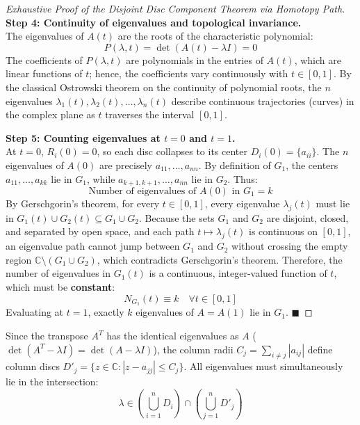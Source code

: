 \begin{proof}[Exhaustive Proof of the Disjoint Disc Component Theorem via Homotopy Path]
\noindent\textbf{Step 4: Continuity of eigenvalues and topological invariance.} \\
The eigenvalues of $A(t)$ are the roots of the characteristic polynomial:
\begin{equation}
    P(\lambda, t) = \det(A(t) - \lambda I) = 0
\end{equation}
The coefficients of $P(\lambda, t)$ are polynomials in the entries of $A(t)$, which are linear functions of $t$; hence, the coefficients vary continuously with $t \in [0, 1]$. By the classical Ostrowski theorem on the continuity of polynomial roots, the $n$ eigenvalues $\lambda_1(t), \lambda_2(t), \dots, \lambda_n(t)$ describe continuous trajectories (curves) in the complex plane as $t$ traverses the interval $[0, 1]$.

\noindent\textbf{Step 5: Counting eigenvalues at $t = 0$ and $t = 1$.} \\
At $t = 0$, $R_i(0) = 0$, so each disc collapses to its center $D_i(0) = \{a_{ii}\}$. The $n$ eigenvalues of $A(0)$ are precisely $a_{11}, \dots, a_{nn}$.
By definition of $G_1$, the centers $a_{11}, \dots, a_{kk}$ lie in $G_1$, while $a_{k+1,k+1}, \dots, a_{nn}$ lie in $G_2$. Thus:
\begin{equation}
    \text{Number of eigenvalues of } A(0) \text{ in } G_1 = k
\end{equation}
By Gerschgorin's theorem, for every $t \in [0, 1]$, every eigenvalue $\lambda_j(t)$ must lie in $G_1(t) \cup G_2(t) \subseteq G_1 \cup G_2$.
Because the sets $G_1$ and $G_2$ are disjoint, closed, and separated by open space, and each path $t \mapsto \lambda_j(t)$ is continuous on $[0, 1]$, an eigenvalue path cannot jump between $G_1$ and $G_2$ without crossing the empty region $\mathbb{C} \setminus (G_1 \cup G_2)$, which contradicts Gerschgorin's theorem.
Therefore, the number of eigenvalues in $G_1(t)$ is a continuous, integer-valued function of $t$, which must be \textbf{constant}:
\begin{equation}
    N_{G_1}(t) \equiv k \quad \forall t \in [0, 1]
\end{equation}
Evaluating at $t = 1$, exactly $k$ eigenvalues of $A = A(1)$ lie in $G_1$. $\blacksquare$
\end{proof}


\begin{notebox}
Since the transpose $A^T$ has the identical eigenvalues as $A$ ($\det(A^T - \lambda I) = \det(A - \lambda I)$), the column radii $C_j = \sum_{i \ne j} |a_{ij}|$ define column discs $D'_j = \{z \in \mathbb{C} : |z - a_{jj}| \le C_j\}$. All eigenvalues must simultaneously lie in the intersection:
\begin{equation}
    \boxed{\lambda \in \left( \bigcup_{i=1}^n D_i \right) \cap \left( \bigcup_{j=1}^n D'_j \right)}
\end{equation}
\end{notebox}

